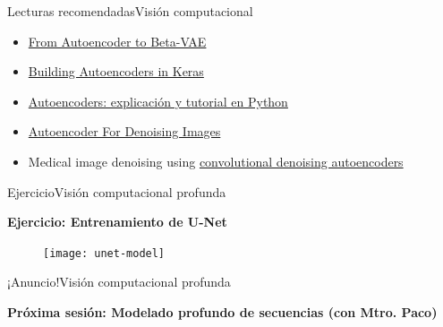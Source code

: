 \documentclass[10pt,border=3pt,tikz]{beamer}
\begin{document}
    \begin{frame}{Lecturas recomendadas}{Visión computacional}
        \begin{itemize}
            \item \colorbox{blue!10}{\href{https://lilianweng.github.io/posts/2018-08-12-vae/}{From Autoencoder to Beta-VAE}}
            \item \colorbox{blue!10}{\href{https://blog.keras.io/building-autoencoders-in-keras.html}{Building Autoencoders in Keras}}
            \item \colorbox{blue!10}{\href{https://www.codificandobits.com/blog/autoencoders-explicacion-y-tutorial-python/}{Autoencoders: explicación y tutorial en Python}}
            \item \colorbox{blue!10}{\href{https://towardsdatascience.com/autoencoder-for-denoising-images-7d63a0831bfd}{Autoencoder For Denoising Images}}
            \item Medical image denoising using \colorbox{blue!10}{\href{https://arxiv.org/pdf/1608.04667}{convolutional denoising autoencoders}}
            
        \end{itemize}
    \end{frame}

    {
        
    }
    
    \begin{frame}{Ejercicio}{Visión computacional profunda}
        \begin{center}
            {\Large \textbf{Ejercicio: Entrenamiento de U-Net}}
        \end{center}
        \begin{figure}
            \centering
            \texttt{[image: unet-model]}
        \end{figure}
    \end{frame}
    
    \begin{frame}{¡Anuncio!}{Visión computacional profunda}
        \begin{center}
            {\Large \textbf{Próxima sesión: Modelado profundo de secuencias (con Mtro. Paco)}}
        \end{center}
    \end{frame}
	
\end{document}
